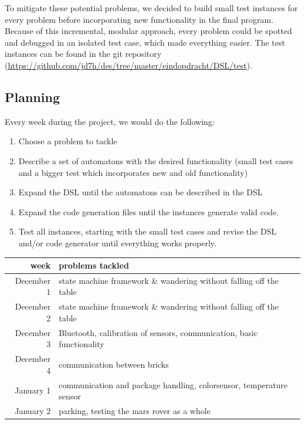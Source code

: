 \documentclass[11pt,a4paper]{article}
\begin{document}
To mitigate these potential problems, we decided to build small test instances for every problem before incorporating new functionality in the final program. Because of this incremental, modular approach, every problem could be spotted and debugged in an isolated test case, which made everything easier. The test instances can be found in the git repository (\url{https://github.com/jd7h/des/tree/master/eindopdracht/DSL/test}). 

\subsection{Planning}
Every week during the project, we would do the following:
\begin{enumerate}
\item Choose a problem to tackle
\item Describe a set of automatons with the desired functionality (small test cases and a bigger test which incorporates new and old functionality)
\item Expand the DSL until the automatons can be described in the DSL
\item Expand the code generation files until the instances generate valid code.
\item Test all instances, starting with the small test cases and revise the DSL and/or code generator until everything works properly. 
\end{enumerate}

\begin{tabular}{|r|p{10cm}|}
\hline
week & problems tackled\\
\hline
December 1	& state machine framework \& wandering without falling off the table\\
December 2	& state machine framework \& wandering without falling off the table\\
December 3	& Bluetooth, calibration of sensors, communication, basic functionality\\
December 4	& communication between bricks\\\hline
January 1	& communication and package handling, colorsensor, temperature sensor\\
January 2	& parking, testing the mars rover as a whole\\
\hline
\end{tabular}


\end{document}
